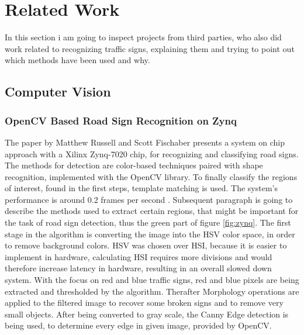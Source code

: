 
\chapter{Related Work}\label{chapter:Related Work}
In this section i am going to inspect projects from third parties, who also did work related to recognizing traffic signs, explaining them and trying to point out which methods have been used and why.

\section{Computer Vision}
\subsection{OpenCV Based Road Sign Recognition on Zynq}
The paper by Matthew Russell and Scott Fischaber presents a system on chip approach with a Xilinx Zynq-7020 chip, for recognizing and classifying road signs. The methods for detection are color-based techniques paired with shape recognition, implemented with the OpenCV library. To finally classify the regions of interest, found in the first steps, template matching is used. The system's performance is around 0.2 frames per second \cite{zynq}. Subsequent paragraph is going to describe the methods used to extract certain regions, that might be important for the task of road sign detection, thus the green part of figure \ref{fig:zynq}. \newline
The first stage in the algorithm is
converting the image into the HSV color space, in order to remove background colors. HSV was chosen over HSI, because it is easier to implement in hardware, calculating  HSI requires more divisions and would therefore increase latency in hardware, resulting in an overall slowed down system. With the focus on red and blue traffic signs, red and blue pixels are being extracted and thresholded by the algorithm. Therafter Morphology  operations  are  applied  to  the  filtered 
image to recover some broken signs and to remove very small objects. After being converted to gray scale, the Canny Edge detection is being used, to determine every edge in given image, provided by OpenCV. 

